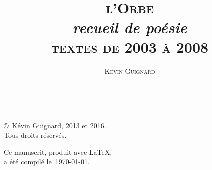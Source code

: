 \documentclass{book}
\title{\Huge{\textsc{l'Orbe}}\\\small{\emph{recueil de poésie}}\\\small{\textsc{textes de 2003 à 2008}}
}
\author{\textsc{Kévin Guignard}}
\date{}
\begin{document}
\maketitle
~
\vfill
\begin{center}
\footnotesize{\copyright~Kévin Guignard, 2013 et 2016.\\Tous droits réservés.}
\end{center}


\newpage

\newpage

\newpage

\newpage

\newpage

\newpage


\tableofcontents
\vfill
\begin{flushright}
Ce manuscrit, produit avec \LaTeX,\\a été compilé le~\today.
\end{flushright}
\end{document}
